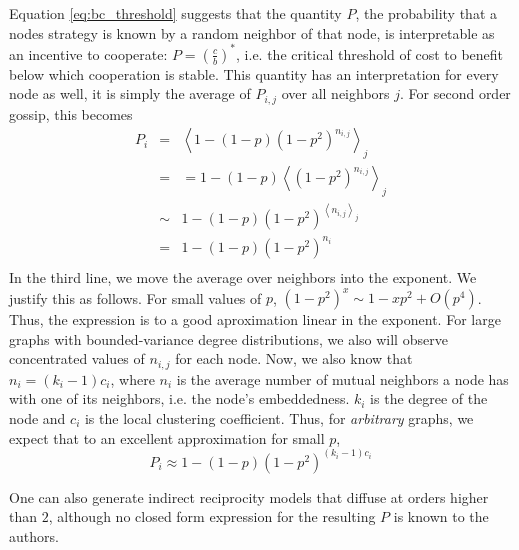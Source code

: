 \documentclass{article}
\renewcommand{\=}[1]{\stackrel{#1}{=}} %
\begin{document}
Equation \ref{eq:bc_threshold} suggests that the quantity $P$, the probability that a nodes strategy is known by a random neighbor of that node, is interpretable as an incentive to cooperate: $P = \left(\frac{c}{b}\right)^*$, i.e. the critical threshold of cost to benefit below which cooperation is stable. This quantity has an interpretation for every node as well, it is simply the average of $P_{i,j}$ over all neighbors $j$. For second order gossip, this becomes
\begin{eqnarray*}
P_{i} &=& \left< 1 - (1-p)(1-p^2)^{n_{i,j}} \right>_j \\
&=& = 1 - (1-p) \left<(1-p^2)^{n_{i,j}}\right>_j\\
&\sim& 1 - (1-p) (1-p^2)^{\left<n_{i,j}\right>_j}\\
&=& 1 - (1-p) (1-p^2)^{n_i}\\
\end{eqnarray*}
In the third line, we move the average over neighbors into the exponent. We justify this as follows. For small values of $p$, $(1-p^2)^x \sim 1 - x p^2 + O(p^4)$. Thus, the expression is to a good aproximation linear in the exponent. For large graphs with bounded-variance degree distributions, we also will observe concentrated values of $n_{i,j}$ for each node. Now, we also know that $n_i = (k_i - 1) c_i$, where $n_i$ is the average number of mutual neighbors a node has with one of its neighbors, i.e. the node's embeddedness. $k_i$ is the degree of the node and $c_i$ is the local clustering coefficient. Thus, for \emph{arbitrary} graphs, we expect that to an excellent approximation for small $p$,
\begin{equation}\label{eq:general_P_second_order}
P_{i} \approx 1 - (1-p) (1-p^2)^{(k_i-1) c_i}
\end{equation}

One can also generate indirect reciprocity models that diffuse at orders higher than $2$, although no closed form expression for the resulting $P$ is known to the authors.
\end{document}
